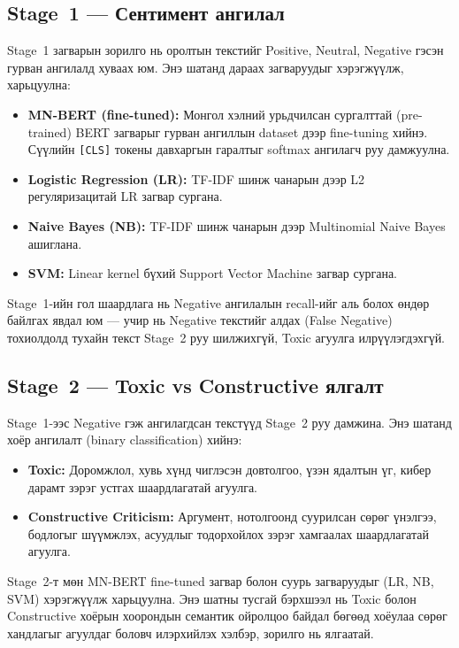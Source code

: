 \subsection{Stage~1 --- Сентимент ангилал}

Stage~1 загварын зорилго нь оролтын текстийг Positive, Neutral, Negative гэсэн
гурван ангилалд хуваах юм. Энэ шатанд дараах загваруудыг хэрэгжүүлж,
харьцуулна:

\begin{itemize}
  \item \textbf{MN-BERT (fine-tuned):} Монгол хэлний урьдчилсан сургалттай
        (pre-trained) BERT загварыг гурван ангиллын dataset дээр fine-tuning
        хийнэ. Сүүлийн \texttt{[CLS]} токены давхаргын гаралтыг softmax
        ангилагч руу дамжуулна.
  \item \textbf{Logistic Regression (LR):} TF-IDF шинж чанарын дээр L2
        регуляризацитай LR загвар сургана.
  \item \textbf{Naive Bayes (NB):} TF-IDF шинж чанарын дээр Multinomial
        Naive Bayes ашиглана.
  \item \textbf{SVM:} Linear kernel бүхий Support Vector Machine загвар
        сургана.
\end{itemize}

Stage~1-ийн гол шаардлага нь Negative ангилалын recall-ийг аль болох
өндөр байлгах явдал юм --- учир нь Negative текстийг алдах (False Negative)
тохиолдолд тухайн текст Stage~2 руу шилжихгүй, Toxic агуулга илрүүлэгдэхгүй.

\subsection{Stage~2 --- Toxic vs Constructive ялгалт}

Stage~1-ээс Negative гэж ангилагдсан текстүүд Stage~2 руу дамжина. Энэ шатанд
хоёр ангилалт (binary classification) хийнэ:

\begin{itemize}
  \item \textbf{Toxic:} Доромжлол, хувь хүнд чиглэсэн довтолгоо, үзэн ядалтын
        үг, кибер дарамт зэрэг устгах шаардлагатай агуулга.
  \item \textbf{Constructive Criticism:} Аргумент, нотолгоонд суурилсан сөрөг
        үнэлгээ, бодлогыг шүүмжлэх, асуудлыг тодорхойлох зэрэг хамгаалах
        шаардлагатай агуулга.
\end{itemize}

Stage~2-т мөн MN-BERT fine-tuned загвар болон суурь загваруудыг (LR, NB, SVM)
хэрэгжүүлж харьцуулна. Энэ шатны тусгай бэрхшээл нь Toxic болон Constructive
хоёрын хоорондын семантик ойролцоо байдал бөгөөд хоёулаа сөрөг хандлагыг
агуулдаг боловч илэрхийлэх хэлбэр, зорилго нь ялгаатай.

